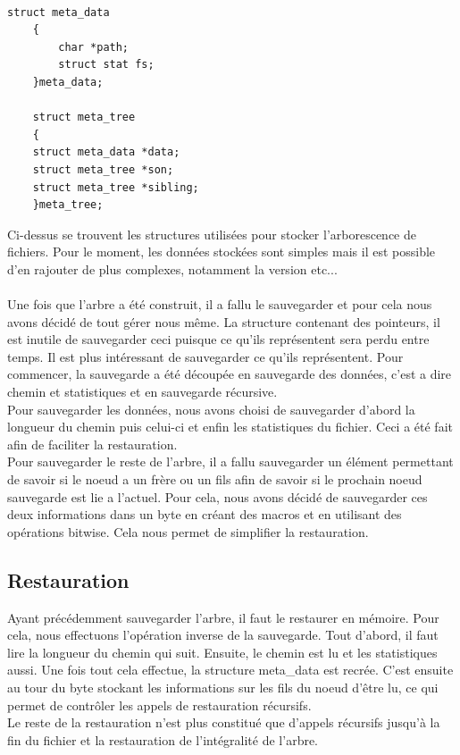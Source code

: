         \paragraph*{}
        \begin{lstlisting}[style=CStyle]
    struct meta_data
    {
        char *path;
        struct stat fs;
    }meta_data;
    
    struct meta_tree
    {
    struct meta_data *data;
    struct meta_tree *son;
    struct meta_tree *sibling;
    }meta_tree;
		\end{lstlisting}
		Ci-dessus se trouvent les structures utilisées pour stocker l'arborescence de fichiers. Pour le moment, les données stockées sont simples mais il est possible d'en rajouter de plus complexes, notamment la version etc...\\
		\paragraph*{}
		Une fois que l'arbre a été construit, il a fallu le sauvegarder et pour cela nous avons décidé de tout gérer nous même. La structure contenant des pointeurs, il est inutile de sauvegarder ceci puisque ce qu'ils représentent sera perdu entre temps. Il est plus intéressant de sauvegarder ce qu'ils représentent. Pour commencer, la sauvegarde a été découpée en sauvegarde des données, c'est a dire chemin et statistiques et en sauvegarde récursive.\\
		Pour sauvegarder les données, nous avons choisi de sauvegarder d'abord la longueur du chemin puis celui-ci et enfin les statistiques du fichier. Ceci a été fait afin de faciliter la restauration.\\
		Pour sauvegarder le reste de l'arbre, il a fallu sauvegarder un élément permettant de savoir si le noeud a un frère ou un fils afin de savoir si le prochain noeud sauvegarde est lie a l'actuel. Pour cela, nous avons décidé de sauvegarder ces deux informations dans un byte en créant des macros et en utilisant des opérations bitwise. Cela nous permet de simplifier la restauration.\\
            
    \subsection{Restauration}
        Ayant précédemment sauvegarder l'arbre, il faut le restaurer en mémoire. Pour cela, nous effectuons l'opération inverse de la sauvegarde. Tout d'abord, il faut lire la longueur du chemin qui suit. Ensuite, le chemin est lu et les statistiques aussi. Une fois tout cela effectue, la structure meta\_data est recrée. C'est ensuite au tour du byte stockant les informations sur les fils du noeud d'être lu, ce qui permet de contrôler les appels de restauration récursifs. \\
        Le reste de la restauration n'est plus constitué que d'appels récursifs jusqu'à la fin du fichier et la restauration de l'intégralité de l'arbre.
        
